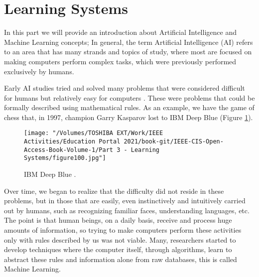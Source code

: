 \part{Learning Systems}

%

%
%


In this part we will provide an introduction about Artificial Intelligence and Machine Learning concepts;
In general, the term Artificial Intelligence (AI) refers to an area that has many strands and topics of study, where most are focused on making computers perform complex tasks, which were previously performed exclusively by humans.

Early AI studies tried and solved many problems that were considered difficult for humans but relatively easy for computers \cite{goodfellow2016}. These were problems that could be formally described using mathematical rules. As an example, we have the game of chess that, in 1997, champion Garry Kasparov lost to IBM Deep Blue (Figure \ref{fig:figure100}).

\begin{figure}
    \centering
    \texttt{[image: "/Volumes/TOSHIBA EXT/Work/IEEE Activities/Education Portal 2021/book-git/IEEE-CIS-Open-Access-Book-Volume-1/Part 3 - Learning Systems/figure100.jpg"]}
    \caption{IBM Deep Blue \cite{img:deepblue}.}
    \label{fig:figure100}
\end{figure}
\newpage

Over time, we began to realize that the difficulty did not reside in these problems, but in those that are easily, even instinctively and intuitively carried out by humans, such as recognizing familiar faces, understanding languages, etc. The point is that human beings, on a daily basis, receive and process huge amounts of information, so trying to make computers perform these activities only with rules described by us was not viable. Many, researchers started to develop techniques where the computer itself, through algorithms, learn to abstract these rules and information alone from raw databases, this is called Machine Learning.

